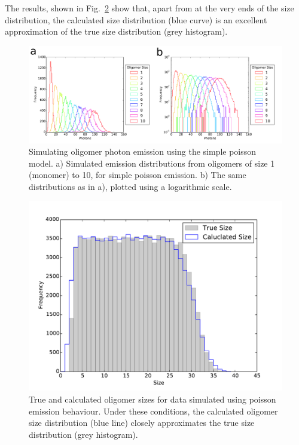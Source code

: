 The results, shown in Fig.~\ref{fig:poisson_size_photons_uniform} show that, apart from at the very ends of the size distribution, the calculated size distribution (blue curve) is an excellent approximation of the true size distribution (grey histogram).        

\begin{figure}
   \begin{center}
      \includegraphics*[clip=true, width=6.5in]{sizing/poisson_size_photons.pdf}
      \caption{Simulating oligomer photon emission using the simple poisson model. a) Simulated emission distributions from oligomers of size 1 (monomer) to 10, for simple poisson emission. b) The same distributions as in a), plotted using a logarithmic scale.}
      \label{fig:poisson_size_photons}
   \end{center}
\end{figure}


\begin{figure}
   \begin{center}
      \includegraphics*[clip=true, width=6in]{sizing/True_vs_Measured_oligomer_events_uniform_poisson_100000_hist.pdf}
      \caption{True and calculated oligomer sizes for data simulated using poisson emission behaviour. Under these conditions, the calculated oligomer size distribution (blue line) closely approximates the true size distribution (grey histogram).}
      \label{fig:poisson_size_photons_uniform}
   \end{center}
\end{figure}

